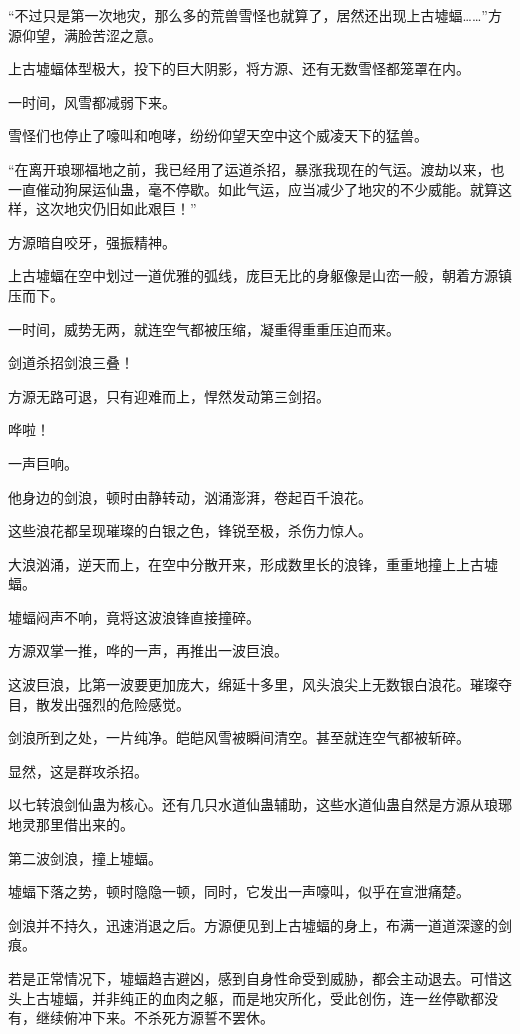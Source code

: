 
\begin{this_body}

“不过只是第一次地灾，那么多的荒兽雪怪也就算了，居然还出现上古墟蝠……”方源仰望，满脸苦涩之意。

上古墟蝠体型极大，投下的巨大阴影，将方源、还有无数雪怪都笼罩在内。

一时间，风雪都减弱下来。

雪怪们也停止了嚎叫和咆哮，纷纷仰望天空中这个威凌天下的猛兽。

“在离开琅琊福地之前，我已经用了运道杀招，暴涨我现在的气运。渡劫以来，也一直催动狗屎运仙蛊，毫不停歇。如此气运，应当减少了地灾的不少威能。就算这样，这次地灾仍旧如此艰巨！”

方源暗自咬牙，强振精神。

上古墟蝠在空中划过一道优雅的弧线，庞巨无比的身躯像是山峦一般，朝着方源镇压而下。

一时间，威势无两，就连空气都被压缩，凝重得重重压迫而来。

剑道杀招剑浪三叠！

方源无路可退，只有迎难而上，悍然发动第三剑招。

哗啦！

一声巨响。

他身边的剑浪，顿时由静转动，汹涌澎湃，卷起百千浪花。

这些浪花都呈现璀璨的白银之色，锋锐至极，杀伤力惊人。

大浪汹涌，逆天而上，在空中分散开来，形成数里长的浪锋，重重地撞上上古墟蝠。

墟蝠闷声不响，竟将这波浪锋直接撞碎。

方源双掌一推，哗的一声，再推出一波巨浪。

这波巨浪，比第一波要更加庞大，绵延十多里，风头浪尖上无数银白浪花。璀璨夺目，散发出强烈的危险感觉。

剑浪所到之处，一片纯净。皑皑风雪被瞬间清空。甚至就连空气都被斩碎。

显然，这是群攻杀招。

以七转浪剑仙蛊为核心。还有几只水道仙蛊辅助，这些水道仙蛊自然是方源从琅琊地灵那里借出来的。

第二波剑浪，撞上墟蝠。

墟蝠下落之势，顿时隐隐一顿，同时，它发出一声嚎叫，似乎在宣泄痛楚。

剑浪并不持久，迅速消退之后。方源便见到上古墟蝠的身上，布满一道道深邃的剑痕。

若是正常情况下，墟蝠趋吉避凶，感到自身性命受到威胁，都会主动退去。可惜这头上古墟蝠，并非纯正的血肉之躯，而是地灾所化，受此创伤，连一丝停歇都没有，继续俯冲下来。不杀死方源誓不罢休。


\end{this_body}
